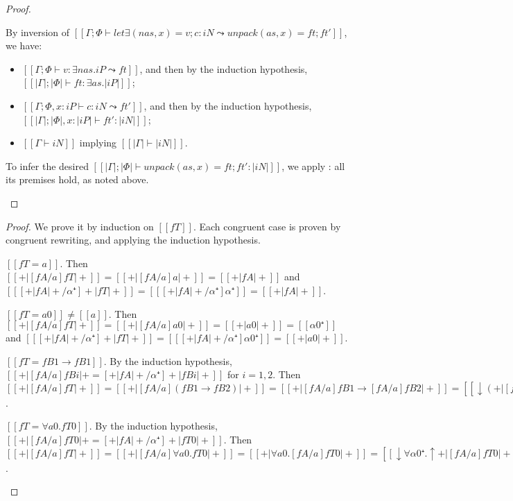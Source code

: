 \begin{proof}
\begin{caseof}
    \item {}
      By inversion of 
      $[[Γ ; Φ ⊢ let∃ (nas, x) = v; c : iN   ⤳  unpack (as, x) = ft; ft']]$, 
      we have:
      \begin{itemize}
        \item $[[Γ ; Φ ⊢ v : ∃nas.iP ⤳ ft]]$, and then by the induction hypothesis,
          $[[|Γ| ; |Φ| ⊢ ft : ∃as.|iP|]]$;
        \item $[[Γ; Φ, x:iP ⊢ c : iN ⤳ ft']]$, and then by the induction hypothesis,
          $[[|Γ| ; |Φ|, x:|iP| ⊢ ft' : |iN|]]$; 
        \item $[[Γ ⊢ iN]]$ implying $[[|Γ| ⊢ |iN|]]$.
      \end{itemize}
      To infer the desired
      $[[|Γ| ; |Φ| ⊢ unpack (as, x) = ft; ft' : |iN|]]$,
      we apply :
      all its premises hold, as noted above.
  \end{caseof}
\end{proof}

\lemmaPolSubst*
\begin{proof}
  We prove it by induction on $[[fT]]$. Each congruent case is proven 
  by congruent rewriting, and applying the induction hypothesis.
  \begin{caseof}
    \item $[[fT = a]]$. Then $[[ +|[fA/a]fT|+ ]] = [[ +|[fA/a]a|+ ]] = [[ +|fA|+ ]]$ and 
    $[[ [+|fA|+ / α⁺] +|fT|+ ]] = [[ [+|fA|+ / α⁺] α⁺ ]] = [[ +|fA|+ ]]$. 
    \item $[[fT = a0]] \neq [[a]]$.
      Then $[[ +|[fA/a]fT|+ ]] = [[ +|[fA/a]a0|+ ]] = [[ +|a0|+ ]] = [[α0⁺]]$ and
      $[[ [+|fA|+ / α⁺] +|fT|+ ]] = [[ [+|fA|+ / α⁺] α0⁺ ]] = [[ +|a0|+ ]]$.
    \item $[[fT = fB1 → fB1]]$. 
      By the induction hypothesis,
      $[[ +|[fA/a]fBi|+ = [+|fA|+ / α⁺] +|fBi|+ ]]$ for $i = 1, 2$.
      Then 
      $[[ +|[fA/a]fT|+ ]] = 
       [[ +|[fA/a](fB1 → fB2)|+ ]] = 
       [[ +|[fA/a]fB1 → [fA/a]fB2|+ ]] = 
       [[ ↓(+|[fA/a]fB1|+ → ↑+|[fA/a]fB2|+) ]] = 
       [[ ↓([+|fA|+ / α⁺] +|fB1|+ → ↑[+|fA|+ / α⁺] +|fB2|+) ]] = 
       [[ [+|fA|+ / α⁺] ↓(+|fB1|+ → ↑+|fB2|+) ]] = 
       [[ [+|fA|+ / α⁺] +|fB1 → fB2|+ ]] = 
       [[ [+|fA|+ / α⁺] +|fT|+ ]]$.
    \item $[[fT = ∀a0.fT0]]$. 
      By the induction hypothesis,
      $[[ +|[fA/a]fT0|+ = [+|fA|+ / α⁺] +|fT0|+ ]]$.
      Then 
      $[[ +|[fA/a]fT|+ ]] = 
       [[ +|[fA/a]∀a0.fT0|+ ]] = 
       [[ +|∀a0.[fA/a]fT0|+ ]] = 
       [[ ↓∀α0⁺.↑+|[fA/a]fT0|+ ]] = 
       [[ ↓∀α0⁺.↑[+|fA|+ / α⁺] +|fT0|+ ]] = 
       [[ [+|fA|+ / α⁺] ↓∀α0⁺.↑+|fT0|+ ]] = 
       [[ [+|fA|+ / α⁺] +|∀a0.fT0|+ ]] = 
       [[ [+|fA|+ / α⁺] +|fT|+ ]]$.
  \end{caseof}
\end{proof}

